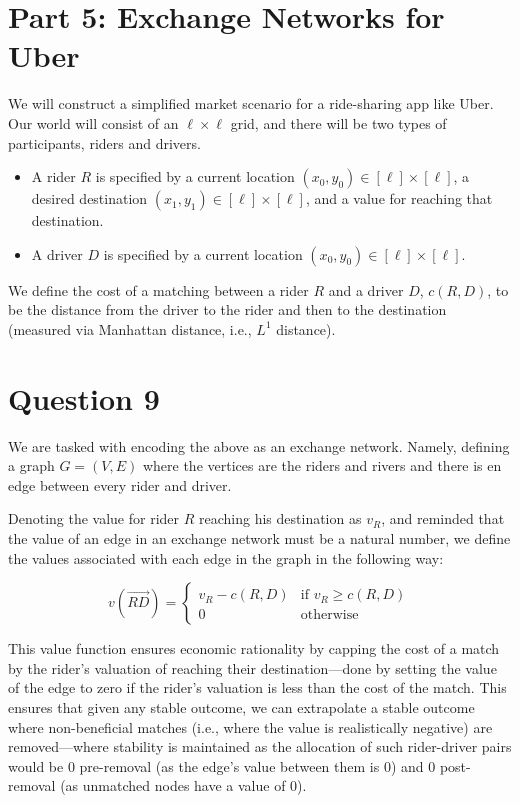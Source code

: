 \documentclass{article}
\begin{document}
\section*{Part 5: Exchange Networks for Uber}
\setcounter{section}{0}
We will construct a simplified market scenario for a ride-sharing app like Uber. Our world will consist of an $\ell \times \ell$ grid, and there will be two types of participants, riders and drivers.

\begin{itemize}
    \item A rider $R$ is specified by a current location $(x_0, y_0) \in [\ell] \times [\ell]$, a desired destination $(x_1, y_1) \in [\ell] \times [\ell]$, and a value for reaching that destination.
    \item A driver $D$ is specified by a current location $(x_0, y_0) \in [\ell] \times [\ell]$.
\end{itemize}

We define the cost of a matching between a rider $R$ and a driver $D$, $c(R, D)$, to be the distance from the driver to the rider and then to the destination (measured via Manhattan distance, i.e., $L^1$ distance).

\section{Question 9}
We are tasked with encoding the above as an exchange network. Namely, defining a graph $G = (V, E)$ where the vertices are the riders and rivers and there is en edge between every rider and driver.

Denoting the value for rider $R$ reaching his destination as $v_R$, and reminded that the value of an edge in an exchange network must be a natural number, we define the values associated with each edge in the graph in the following way:

\begin{equation*}
    v(\overrightarrow{RD}) = \begin{cases}
        v_R - c(R, D) & \text{if } v_R \geq c(R, D) \\
        0 & \text{otherwise}
    \end{cases}
\end{equation*}

This value function ensures economic rationality by capping the cost of a match by the rider's valuation of reaching their destination---done by setting the value of the edge to zero if the rider's valuation is less than the cost of the match. This ensures that given any stable outcome, we can extrapolate a stable outcome where non-beneficial matches (i.e., where the value is realistically negative) are removed---where stability is maintained as the allocation of such rider-driver pairs would be 0 pre-removal (as the edge's value between them is 0) and 0 post-removal (as unmatched nodes have a value of 0).
\end{document}
